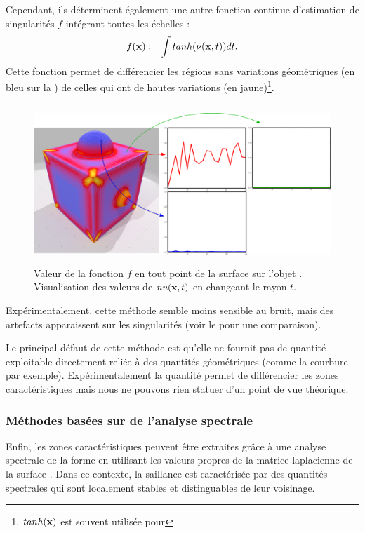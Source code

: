 Cependant, ils déterminent également une autre fonction continue d'estimation de
singularités $f$ intégrant toutes les échelles :
%
\begin{equation}
   f(\mathbf{x}) := \int tanh(\nu(\mathbf{x},t)) dt .
\end{equation}
%
Cette fonction permet de différencier les régions sans variations géométriques (en bleu sur
la ) de celles qui ont de hautes variations
(en jaune)\footnote{$tanh(\mathbf{x})$ est souvent utilisée pour }.

\begin{figure}[ht]{
  \begin{center}
    \includegraphics[height=6cm]{figures/CubeSpherePlotMellado}
  \end{center}}
  \caption[Valeur de la fonction $f$ en tout point de la surface sur
  l'objet \CubeSphere.]{Valeur de la fonction $f$ en tout point de la surface sur
  l'objet \CubeSphere. Visualisation des valeurs de $nu(\mathbf{x},t)$ en changeant le
  rayon $t$. \label{fig:mellado-cubesphere}}
\end{figure}

Expérimentalement, cette méthode semble moins sensible au bruit, mais des
artefacts apparaissent sur les singularités (voir le
 pour une comparaison).


Le principal défaut de cette méthode est qu'elle ne fournit pas de quantité
exploitable directement reliée à des quantités géométriques (comme la courbure
par exemple). Expérimentalement la quantité permet de différencier les zones
caractéristiques mais nous ne pouvons rien statuer d'un point de vue théorique.
%
\subsubsection{Méthodes basées sur de l'analyse spectrale}%
\label{sec:applications:feature:spectral}
%
Enfin, les zones caractéristiques peuvent être extraites grâce à une analyse
spectrale de la forme en utilisant les valeurs propres de la matrice laplacienne
de la surface \cite{GebalBAL09,Sun2009,Song2014}. Dans ce contexte, la saillance
est caractérisée par des quantités spectrales qui sont localement stables et
distinguables de leur voisinage.
%
